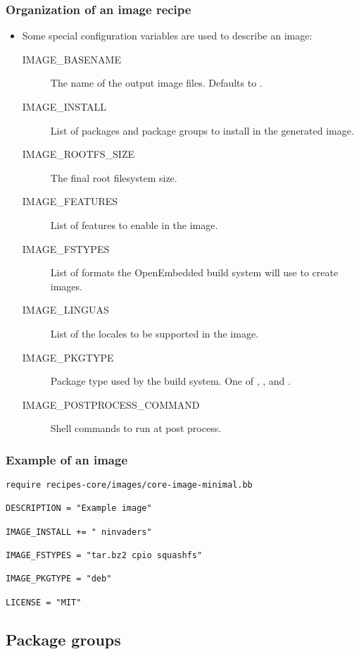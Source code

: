 \begin{frame}
  \frametitle{Organization of an image recipe}
  \begin{itemize}
    \item Some special configuration variables are used to describe an
      image:
      \begin{description}
        \item[IMAGE\_BASENAME] The name of the output image files.
          Defaults to .
        \item[IMAGE\_INSTALL] List of packages and package groups to
          install in the generated image.
        \item[IMAGE\_ROOTFS\_SIZE] The final root filesystem size.
        \item[IMAGE\_FEATURES] List of features to enable in the
          image.
        \item[IMAGE\_FSTYPES] List of formats the OpenEmbedded build
          system will use to create images.
        \item[IMAGE\_LINGUAS] List of the locales to be supported in
          the image.
        \item[IMAGE\_PKGTYPE] Package type used by the build system.
          One of , ,  and .
        \item[IMAGE\_POSTPROCESS\_COMMAND] Shell commands to run at
          post process.
      \end{description}
  \end{itemize}
\end{frame}

\begin{frame}[fragile]
  \frametitle{Example of an image}
  \begin{block}{}
    \begin{verbatim}
require recipes-core/images/core-image-minimal.bb

DESCRIPTION = "Example image"

IMAGE_INSTALL += " ninvaders"

IMAGE_FSTYPES = "tar.bz2 cpio squashfs"

IMAGE_PKGTYPE = "deb"

LICENSE = "MIT"
    \end{verbatim}
  \end{block}
\end{frame}
\subsection{Package groups}

